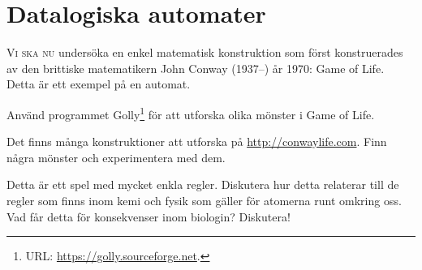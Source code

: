 \chapter{Datalogiska automater}

\lettrine{V}{i ska nu} undersöka en enkel matematisk konstruktion som först 
konstruerades av den brittiske matematikern John Conway (1937--) år 1970: 
\foreignlanguage{english}{Game of Life}.
Detta är ett exempel på en automat.

\begin{exercise}
  Använd programmet Golly\footnote{%
    URL: \url{https://golly.sourceforge.net}.
  } för att utforska olika mönster i \foreignlanguage{english}{Game of Life}.
\end{exercise}

\begin{exercise}
  Det finns många konstruktioner att utforska på \url{http://conwaylife.com}.
  Finn några mönster och experimentera med dem.
\end{exercise}

\begin{exercise}
  Detta är ett spel med mycket enkla regler.
  Diskutera hur detta relaterar till de regler som finns inom kemi och fysik 
  som gäller för atomerna runt omkring oss.
  Vad får detta för konsekvenser inom biologin?
  Diskutera!
\end{exercise}
